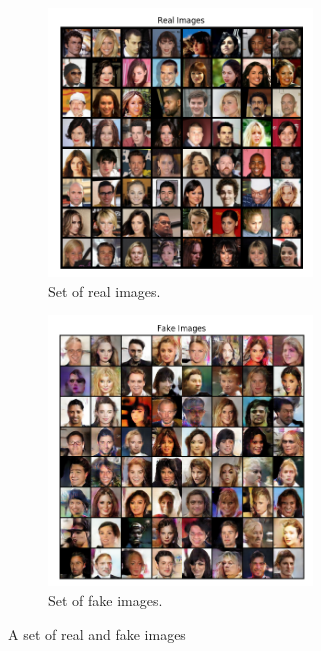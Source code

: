 \documentclass[12pt]{article}
\begin{document}
		\begin{figure}
			\centering
			\begin{framed}
			\begin{subfigure}{.5\textwidth}
				\centering
				\includegraphics[width=7cm]{Real_Images_1.png}
				\caption{Set of real images.}
				\label{fig:sub1}
			\end{subfigure}%
			\begin{subfigure}{.5\textwidth}
				\centering
				\includegraphics[width=7cm]{Fake_Images_1.png}
				\caption{Set of fake images.}
				\label{fig:sub2}
			\end{subfigure}
			\caption{A set of real and fake images}
			\label{fig:test}
			\end{framed}
		\end{figure}
		
	
\end{document}

